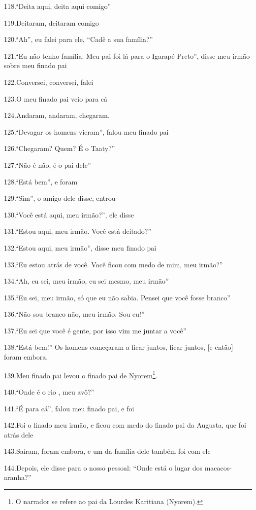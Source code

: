 118.``Deita aqui, deita aqui comigo''

119.Deitaram, deitaram comigo

120.``Ah'', eu falei para ele, ``Cadê a sua família?''

121.``Eu não tenho família. Meu pai foi lá para o Igarapé Preto'', disse
meu irmão sobre meu finado pai

122.Conversei, conversei, falei

123.O meu finado pai veio para cá

124.Andaram, andaram, chegaram.

125.``Devagar os homens vieram'', falou meu finado pai

126.``Chegaram? Quem? É o Taaty?''

127.``Não é não, é o pai dele''

128.``Está bem'', e foram

129.``Sim'', o amigo dele disse, entrou

130.``Você está aqui, meu irmão?'', ele disse

131.``Estou aqui, meu irmão. Você está deitado?''

132.``Estou aqui, meu irmão'', disse meu finado pai

133.``Eu estou atrás de você. Você ficou com medo de mim, meu irmão?''

134.``Ah, eu sei, meu irmão, eu sei mesmo, meu irmão''

135.``Eu sei, meu irmão, só que eu não sabia. Pensei que você fosse
branco''

136.``Não sou branco não, meu irmão. Sou eu!''

137.``Eu sei que você é gente, por isso vim me juntar a você''

138.``Está bem!'' Os homens começaram a ficar juntos, ficar juntos, {[}e
então{]} foram embora.

139.Meu finado pai levou o finado pai de Nyorem\footnote{O narrador se
  refere ao pai da Lourdes Karitiana (Nyorem).}.

140.``Onde é o rio , meu avô?''

141.``É para cá'', falou meu finado pai, e foi

142.Foi o finado meu irmão, e ficou com medo do finado pai da Augusta,
que foi atrás dele

143.Saíram, foram embora, e um da família dele também foi com ele

144.Depois, ele disse para o nosso pessoal: ``Onde está o lugar dos
macacos- aranha?''


